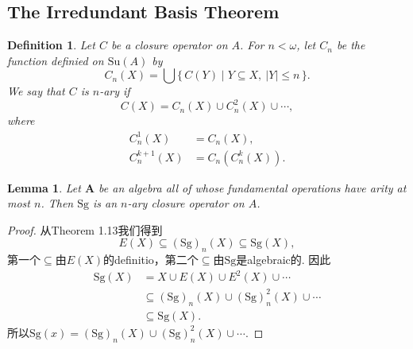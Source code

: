 \documentclass{article}
\newtheorem{lemma}[theorem]{Lemma}
\newtheorem{definition}[theorem]{Definition}
\newcommand\Set[2]{\{\,#1\mid#2\,\}} %
\newcommand\Sg{\text{Sg}}
\newcommand\algebra{\mathbf{A}}
\begin{document}
\newpage
\subsection{The Irredundant Basis Theorem}

\begin{definition}
\rm Let $C$ be a closure operator on $A$. For $n < \omega$, let $C_n$ be the function definied on $\text{Su}(A)$ by 
$$
C_n(X) = \bigcup\Set{C(Y)}{Y \subseteq X,\ |Y| \leq n}.
$$
We say that $C$ is $n$-ary if 
$$
C(X) = C_n (X) \cup C_n^2(X) \cup \cdots,
$$
where 
$$
\begin{aligned}
C_n^1(X) &= C_n(X), \\
C_n^{k+1}(X) &= C_n(C_n^k(X)).
\end{aligned}
$$
\end{definition}

\begin{lemma}
\rm Let $\algebra$ be an algebra all of whose fundamental operations have arity at most $n$. Then $\Sg$ is an $n$-ary closure operator on $A$.
\end{lemma}

\begin{proof}
从Theorem 1.13我们得到
$$
 E(X) \subseteq (\Sg)_n(X) \subseteq \Sg(X),
$$
第一个$\subseteq$由$E(X)$的definitio，第二个$\subseteq$由$\Sg$是algebraic的. 因此
$$
\begin{aligned}
\Sg(X) &= X \cup E(X) \cup E^2(X) \cup \cdots \\
 &\subseteq (\Sg)_n(X) \cup (\Sg)_n^2(X) \cup \cdots \\
 &\subseteq \Sg(X).
\end{aligned}
$$
所以$\Sg(x) = (\Sg)_n(X) \cup (\Sg)_n^2(X) \cup \cdots . $
\end{proof}
\end{document}
